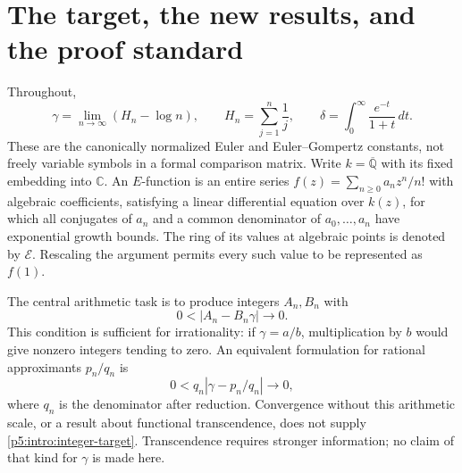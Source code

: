 \documentclass[11pt,a4paper]{article}
\theoremstyle{definition}
\theoremstyle{remark}
\numberwithin{equation}{section}
\begin{document}
\section{The target, the new results, and the proof standard}

Throughout,
\[
 \gamma=\lim_{n\to\infty}(H_n-\log n),\qquad
 H_n=\sum_{j=1}^n\frac1j,\qquad
 \delta=\int_0^\infty\frac{e^{-t}}{1+t}\,dt.
\]
These are the canonically normalized Euler and Euler--Gompertz
constants, not freely variable symbols in a formal comparison matrix.
Write $k=\overline{\mathbb Q}$ with its fixed embedding into
$\mathbb C$. An $E$-function is an entire series
$f(z)=\sum_{n\ge0}a_nz^n/n!$ with algebraic coefficients, satisfying
a linear differential equation over $k(z)$, for which all conjugates
of $a_n$ and a common denominator of $a_0,\ldots,a_n$ have exponential
growth bounds. The ring of its values at algebraic points is denoted
by $\mathcal E$. Rescaling the argument permits every such value to
be represented as $f(1)$.

The central arithmetic task is to produce integers $A_n,B_n$ with
\begin{equation}\label{p5:intro:integer-target}
 0<|A_n-B_n\gamma|\longrightarrow0.
\end{equation}
This condition is sufficient for irrationality: if $\gamma=a/b$,
multiplication by $b$ would give nonzero integers tending to zero.
An equivalent formulation for rational approximants $p_n/q_n$ is
\[
 0<q_n|\gamma-p_n/q_n|\longrightarrow0,
\]
where $q_n$ is the denominator after reduction. Convergence without
this arithmetic scale, or a result about functional transcendence,
does not supply \eqref{p5:intro:integer-target}. Transcendence requires
stronger information; no claim of that kind for $\gamma$ is made here.
\end{document}
